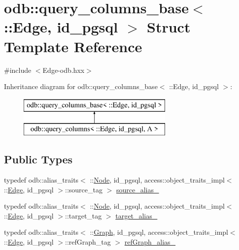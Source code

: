 \hypertarget{structodb_1_1query__columns__base_3_01_1_1_edge_00_01id__pgsql_01_4}{}\section{odb\+:\+:query\+\_\+columns\+\_\+base$<$ \+:\+:Edge, id\+\_\+pgsql $>$ Struct Template Reference}
\label{structodb_1_1query__columns__base_3_01_1_1_edge_00_01id__pgsql_01_4}


{\ttfamily \#include $<$Edge-\/odb.\+hxx$>$}

Inheritance diagram for odb\+:\+:query\+\_\+columns\+\_\+base$<$ \+:\+:Edge, id\+\_\+pgsql $>$\+:\begin{figure}[H]
\begin{center}
\leavevmode
\includegraphics[height=2.000000cm]{d9/dd9/structodb_1_1query__columns__base_3_01_1_1_edge_00_01id__pgsql_01_4}
\end{center}
\end{figure}
\subsection*{Public Types}
\begin{DoxyCompactItemize}
\item 
typedef odb\+::alias\+\_\+traits$<$ \+::\hyperlink{class_node}{Node}, id\+\_\+pgsql, access\+::object\+\_\+traits\+\_\+impl$<$ \+::\hyperlink{class_edge}{Edge}, id\+\_\+pgsql $>$\+::source\+\_\+tag $>$ \hyperlink{structodb_1_1query__columns__base_3_01_1_1_edge_00_01id__pgsql_01_4_a84e91c6138f19476b1c2d0d9ef440209}{source\+\_\+alias\+\_\+}
\item 
typedef odb\+::alias\+\_\+traits$<$ \+::\hyperlink{class_node}{Node}, id\+\_\+pgsql, access\+::object\+\_\+traits\+\_\+impl$<$ \+::\hyperlink{class_edge}{Edge}, id\+\_\+pgsql $>$\+::target\+\_\+tag $>$ \hyperlink{structodb_1_1query__columns__base_3_01_1_1_edge_00_01id__pgsql_01_4_ab87aa44ce979953bb90a322eba2a996d}{target\+\_\+alias\+\_\+}
\item 
typedef odb\+::alias\+\_\+traits$<$ \+::\hyperlink{class_graph}{Graph}, id\+\_\+pgsql, access\+::object\+\_\+traits\+\_\+impl$<$ \+::\hyperlink{class_edge}{Edge}, id\+\_\+pgsql $>$\+::ref\+Graph\+\_\+tag $>$ \hyperlink{structodb_1_1query__columns__base_3_01_1_1_edge_00_01id__pgsql_01_4_a44388dfa7d5b1acd4479b296cff6701a}{ref\+Graph\+\_\+alias\+\_\+}
\end{DoxyCompactItemize}


